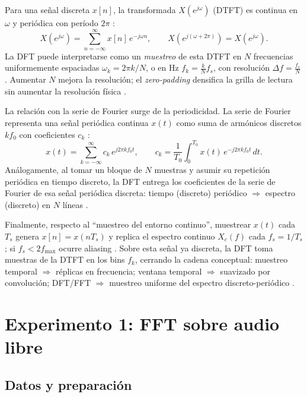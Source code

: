 \documentclass[letter,12pt]{article}
\begin{document}
Para una señal discreta \(x[n]\), la transformada \(X(e^{j\omega})\) (DTFT) es continua en \(\omega\) y periódica con período \(2\pi\) \cite{OppenheimSchaferDTSP3e,NISTDLMF_Fourier}:
\[
X(e^{j\omega})=\sum_{n=-\infty}^{\infty} x[n]\,e^{-j\omega n},\qquad
X(e^{j(\omega+2\pi)})=X(e^{j\omega}).
\]
La DFT puede interpretarse como un \emph{muestreo} de esta DTFT en \(N\) frecuencias uniformemente espaciadas \( \omega_k=2\pi k/N \), o en Hz \( f_k=\tfrac{k}{N}f_s \), con resolución \(\Delta f=\tfrac{f_s}{N}\) \cite{OppenheimSchaferDTSP3e,VetterliKovacevicGoyalFSP2014,SciPyFFT2024}. Aumentar \(N\) mejora la resolución; el \emph{zero-padding} densifica la grilla de lectura sin aumentar la resolución física \cite{SciPyFFT2024,NumPyFFT2024}.

La relación con la serie de Fourier surge de la periodicidad. La serie de Fourier representa una señal periódica continua \(x(t)\) como suma de armónicos discretos \(k f_0\) con coeficientes \(c_k\) \cite{OsgoodFTAMS2019,NISTDLMF_Fourier}:
\[
x(t)=\sum_{k=-\infty}^{\infty} c_k\,e^{j2\pi k f_0 t},\qquad
c_k=\frac{1}{T_0}\int_{0}^{T_0} x(t)\,e^{-j2\pi k f_0 t}\,dt.
\]
Análogamente, al tomar un bloque de \(N\) muestras y asumir su repetición periódica en tiempo discreto, la DFT entrega los coeficientes de la serie de Fourier de esa señal periódica discreta: tiempo (discreto) periódico \(\Rightarrow\) espectro (discreto) en \(N\) líneas \cite{OppenheimSchaferDTSP3e,VetterliKovacevicGoyalFSP2014}.

Finalmente, respecto al “muestreo del entorno continuo”, muestrear \(x(t)\) cada \(T_s\) genera \(x[n]=x(nT_s)\) y replica el espectro continuo \(X_c(f)\) cada \(f_s=1/T_s\); si \(f_s<2f_{\max}\) ocurre aliasing \cite{OppenheimSchaferDTSP3e,OsgoodFTAMS2019}. Sobre esta señal ya discreta, la DFT toma muestras de la DTFT en los bins \(f_k\), cerrando la cadena conceptual: muestreo temporal \(\Rightarrow\) réplicas en frecuencia; ventana temporal \(\Rightarrow\) suavizado por convolución; DFT/FFT \(\Rightarrow\) muestreo uniforme del espectro discreto-periódico \cite{OppenheimSchaferDTSP3e,SciPyFFT2024}.



\section{Experimento 1: FFT sobre audio libre}

\subsection{Datos y preparación}
\end{document}
